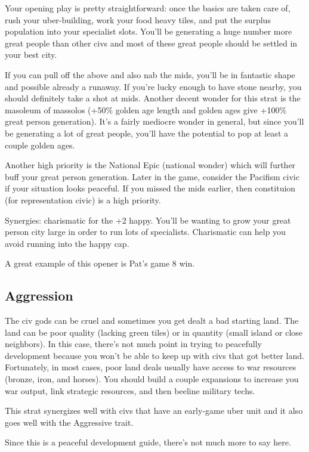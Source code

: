 \documentclass[10pt]{article}
\begin{document}
Your opening play is pretty straightforward: once the basics are taken
care of, rush your uber-building, work your food heavy tiles, and put
the surplus population into your specialist slots. You'll be
generating a huge number more great people than other civs and most of
these great people should be settled in your best city.

If you can pull off the above and also nab the mids, you'll be in
fantastic shape and possible already a runaway. If you're lucky enough
to have stone nearby, you should definitely take a shot at
mids. Another decent wonder for this strat is the masoleum of massolos
(+50\% golden age length and golden ages give +100\% great person
generation). It's a fairly mediocre wonder in general, but since
you'll be generating a lot of great people, you'll have the potential
to pop at least a couple golden ages.

Another high priority is the National Epic (national wonder) which
will further buff your great person generation. Later in the game,
consider the Pacifism civic if your situation looks peaceful. If you
missed the mids earlier, then constituion (for representation civic)
is a high priority.

Synergies: charismatic for the +2 happy. You'll be wanting to grow
your great person city large in order to run lots of
specialists. Charismatic can help you avoid running into the happy
cap.

A great example of this opener is Pat's game 8 win.

\subsection*{Aggression}

The civ gods can be cruel and sometimes you get dealt a bad starting
land. The land can be poor quality (lacking green tiles) or in
quantity (small island or close neighbors). In this case, there's not
much point in trying to peacefully development because you won't be
able to keep up with civs that got better land. Fortunately, in most
cases, poor land deals usually have access to war resources (bronze,
iron, and horses). You should build a couple expansions to increase
you war output, link strategic resources, and then beeline military
techs.

This strat synergizes well with civs that have an early-game uber unit
and it also goes well with the Aggressive trait.

Since this is a peaceful development guide, there's not much more to say here.
\end{document}
